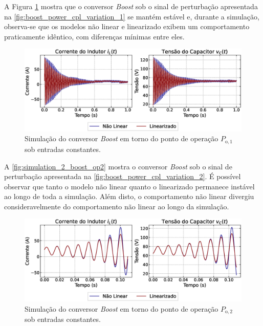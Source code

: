 A Figura \ref{fig:simulation_2_boost_op1} mostra que o conversor \textit{Boost} sob o sinal de perturbação apresentada na \autoref{fig:boost_power_cpl_variation_1} se mantém estável e, durante a simulação, observa-se que os modelos não linear e linearizado exibem um comportamento praticamente idêntico, com diferenças mínimas entre eles.

 
\begin{figure}[H]
  \centering
  \captionsetup{justification=centering}
  \includegraphics[width=1.\textwidth]{figuras/boost/sim2/op1/result.eps}
  \caption{Simulação do conversor \textit{Boost} em torno do ponto de operação $P_{\mathrm{o}, 1}$ sob entradas constantes.}
  \label{fig:simulation_2_boost_op1}
\end{figure}

A \autoref{fig:simulation_2_boost_op2} mostra o conversor \textit{Boost} sob o sinal de perturbação apresentada na \autoref{fig:boost_power_cpl_variation_2}. É possível observar que tanto o modelo não linear quanto o linearizado permanece instável ao longo de toda a simulação. Além disto, o comportamento não linear  divergiu consideravelmente do comportamento não linear ao longo da simulação.

\begin{figure}[H]
  \centering
  \captionsetup{justification=centering}
  \includegraphics[width=1.\textwidth]{figuras/boost/sim2/op2/result.eps}
  \caption{Simulação do conversor \textit{Boost} em torno do ponto de operação $P_{\mathrm{o}, 2}$ sob entradas constantes.}
  \label{fig:simulation_2_boost_op2}
\end{figure}
